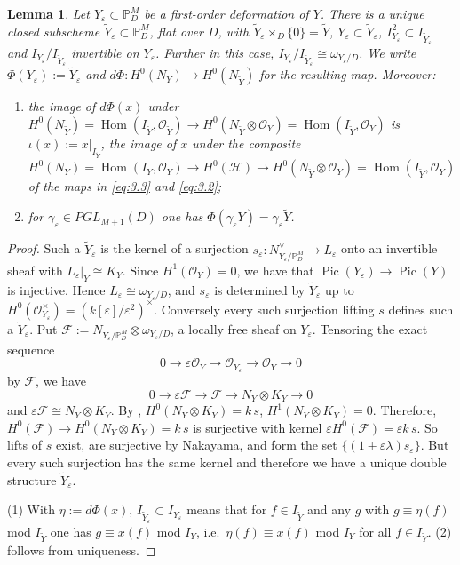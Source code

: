 \documentclass[11pt,reqno]{amsart}
\theoremstyle{plain}
\newtheorem{lemma}[theorem]{Lemma}
\theoremstyle{definition}
\newcommand{\PM}{\mathbb{P}^M}
\newcommand{\OO}{\mathcal{O}}
\newcommand{\Yt}{\widetilde{Y}}
\newcommand{\NY}{N_{Y}}
\newcommand{\NYt}{N_{\Yt}}
\newcommand{\Hc}{\mathcal{H}}
\newcommand{\Dd}{D}
\begin{document}
\begin{lemma}\label{lem:Phi}
Let $Y_\varepsilon\subset\PM_\Dd$ be a first-order deformation of $Y$. There is a unique closed subscheme $\Yt_\varepsilon\subset\PM_\Dd$, flat over $\Dd$, with $\Yt_\varepsilon\times_\Dd\{0\}=\Yt$, $Y_\varepsilon\subset\Yt_\varepsilon$, $I_{Y_\varepsilon}^2\subset I_{\Yt_\varepsilon}$ and $I_{Y_\varepsilon}/I_{\Yt_\varepsilon}$ invertible on $Y_\varepsilon$. Further in this case, $I_{Y_\varepsilon}/I_{\Yt_\varepsilon} \cong \omega_{Y_{\varepsilon}/D}$.  We write $\Phi(Y_\varepsilon):=\Yt_\varepsilon$ and $d\Phi\colon H^0(\NY)\to H^0(\NYt)$ for the resulting map. Moreover:
\begin{enumerate}
\item the image of $d\Phi(x)$ under $H^0(\NYt) = \operatorname{Hom}(I_{\widetilde Y}, \mathcal O_{\widetilde Y})\to H^0(\NYt\otimes\OO_Y) = \operatorname{Hom}(I_{\widetilde Y}, \mathcal O_{Y})$ is $\iota(x):=x|_{I_{\Yt}}$, the image of $x$ under the composite $H^0(\NY) = \operatorname{Hom}(I_{Y}, \mathcal O_{Y})\to H^0(\Hc)\to H^0(\NYt\otimes\OO_Y) = \operatorname{Hom}(I_{\widetilde Y}, \mathcal O_{Y})$ of the maps in \eqref{eq:3.3} and \eqref{eq:3.2};
\item for $\gamma_\varepsilon\in PGL_{M+1}(\Dd)$ one has $\Phi(\gamma_\varepsilon Y)=\gamma_\varepsilon\Yt$.
\end{enumerate}
\end{lemma}

\begin{proof}
Such a $\Yt_\varepsilon$ is the kernel of a surjection $s_\varepsilon\colon N_{Y_\varepsilon/\PM_\Dd}^{\vee}\to L_\varepsilon$ onto an invertible sheaf with $L_\varepsilon|_Y\cong K_Y$. Since $H^1(\mathcal{O}_Y) = 0$, we have that $\operatorname{Pic}(Y_\varepsilon)\to\operatorname{Pic}(Y)$ is injective. Hence  $L_\varepsilon\cong\omega_{Y_\varepsilon/\Dd}$, and $s_\varepsilon$ is determined by $\Yt_\varepsilon$ up to $H^0(\OO_{Y_\varepsilon}^{\times})=(k[\varepsilon]/\varepsilon^2)^{\times}$. Conversely every such surjection lifting $s$ defines such a $\Yt_\varepsilon$. Put $\mathcal{F}:=N_{Y_\varepsilon/\PM_\Dd}\otimes\omega_{Y_\varepsilon/\Dd}$, a locally free sheaf on $Y_\varepsilon$. Tensoring the exact sequence 
$$0 \to \varepsilon \mathcal{O}_Y \to \mathcal{O}_{Y_{\varepsilon}} \to \mathcal{O}_Y \to 0$$
by $\mathcal F$, we have $$0\to\varepsilon\mathcal{F}\to\mathcal{F}\to\NY\otimes K_Y\to 0$$ 
and $\varepsilon\mathcal{F}\cong\NY\otimes K_Y$. By , $H^0(\NY\otimes K_Y)=k\,s$,  $H^1(\NY\otimes K_Y)=0$. Therefore, $H^0(\mathcal{F})\to H^0(\NY\otimes K_Y)=k\,s$ is surjective with kernel $\varepsilon H^0(\mathcal{F})=\varepsilon k\,s$. So lifts of $s$ exist, are surjective by Nakayama, and form the set $\{(1+\varepsilon\lambda)s_\varepsilon\}$. But every such surjection has the same kernel and therefore we have a unique double structure $\widetilde{Y}_{\varepsilon}$.

(1) With $\eta:=d\Phi(x)$, $I_{\Yt_\varepsilon}\subset I_{Y_\varepsilon}$ means that for $f\in I_{\Yt}$ and any $g$ with $g\equiv\eta(f)$ mod $I_{\Yt}$ one has $g\equiv x(f)$ mod $I_Y$, i.e.\ $\eta(f)\equiv x(f)$ mod $I_Y$ for all $f\in I_{\Yt}$. (2) follows from uniqueness.
\end{proof}
\end{document}
